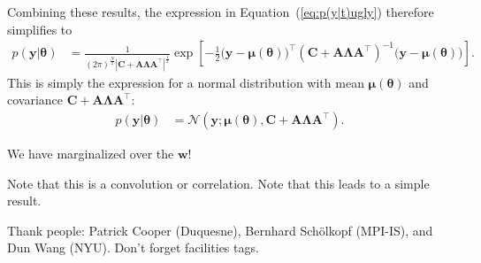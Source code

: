 \documentclass[modern]{rnaastex}
\renewcommand{\eqref}[1]{\ref{eq:#1}}
\newcommand{\Eq}[1]{Equation~(\eqref{#1})}
\newcommand{\eq}[1]{\Eq{#1}}
\newcommand{\eqlabel}[1]{\label{eq:#1}}
\newcommand{\bvec}[1]{{\ensuremath{\boldsymbol{#1}}}}
\newcommand{\Normal}{\ensuremath{\mathcal{N}}}
\newcommand{\mA}{\ensuremath{\bvec{A}}}
\newcommand{\mC}{\ensuremath{\bvec{C}}}
\newcommand{\mL}{\ensuremath{\bvec{\Lambda}}}
\newcommand{\vw}{\ensuremath{\bvec{w}}}
\newcommand{\vy}{\ensuremath{\bvec{y}}}
\newcommand{\vt}{\ensuremath{\bvec{\theta}}}
\newcommand{\vm}{\ensuremath{\bvec{\mu}(\bvec{\theta})}}
\begin{document}
%
Combining these results, the expression in \eq{p(y|t)ugly} therefore simplifies to
\begin{align}
\eqlabel{p(y|t)exp}
p(\vy | \vt) &= \frac{1}{(2 \pi)^\frac{N}{2}
                |\mC + \mA \mL \mA^\top|^\frac{1}{2}} 
                \exp \left[ -\frac{1}{2} \big( \vy - \vm \big)^\top 
                            (\mC + \mA \mL \mA^\top)^{-1} 
                            \big( \vy - \vm \big) 
                     \right].
\end{align}
This is simply the expression for a normal distribution with mean $\vm$ and covariance
$\mC + \mA \mL \mA^\top$:
%
\begin{align}
\eqlabel{p(y|t)normal}
p(\vy | \vt) &= \Normal (\vy; \vm, \mC + \mA \mL \mA^\top).
\end{align}

We have marginalized over the $\vw$!

Note that this is a convolution or correlation. Note that this leads to a simple result.

\acknowledgements
Thank people:
  Patrick Cooper (Duquesne),
  Bernhard Sch\"olkopf (MPI-IS), and
  Dun Wang (NYU).
Don't forget facilities tags.


\end{document}

